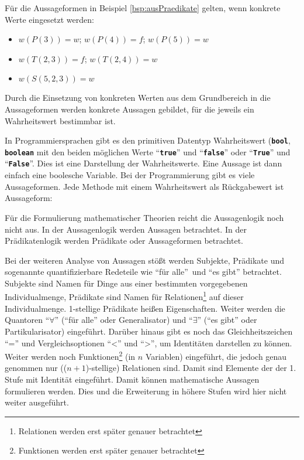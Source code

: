 \begin{Unit}[Beispiel]
Für die Aussageformen in Beispiel \ref{bsp:ausPraedikate} gelten, wenn 
konkrete Werte eingesetzt werden:
\begin{itemize}
  \item $w(P(3)) = w$; $w(P(4)) = f$; $w(P(5)) = w$
  \item $w(T(2,3)) = f$; $w(T(2,4)) = w$
  \item $w(S(5,2,3)) = w$
\end{itemize}

Durch die Einsetzung von konkreten Werten aus dem Grundbereich in die 
Aussageformen werden konkrete Aussagen gebildet, für die jeweils ein 
Wahrheitswert bestimmbar ist.
\end{Unit}

\begin{Unit}[Beispiel]
In Programmiersprachen gibt es den primitiven Datentyp Wahrheitswert
(\textbf{\texttt{bool}}, \textbf{\texttt{boolean}} mit den beiden möglichen 
Werte \enquote{\textbf{\texttt{true}}} und \enquote{\textbf{\texttt{false}}} 
oder \enquote{\textbf{\texttt{True}}} und \enquote{\textbf{\texttt{False}}}. 
Dies ist eine Darstellung der Wahrheitswerte. Eine Aussage ist dann einfach 
eine boolesche Variable. Bei der Programmierung gibt es viele Aussageformen. 
Jede Methode mit einem Wahrheitswert als Rückgabewert ist Aussageform:
\end{Unit}

\begin{Unit}[Anmerkung]
Für die Formulierung mathematischer Theorien reicht die Aussagenlogik noch 
nicht aus. In der Aussagenlogik werden Aussagen betrachtet. In der 
Prädikatenlogik werden Prädikate oder Aussageformen betrachtet.

Bei der weiteren Analyse von Aussagen stößt werden Subjekte, Prädikate und
sogenannte quantifizierbare Redeteile wie \enquote{für alle}\ und 
\enquote{es gibt} betrachtet. Subjekte sind Namen für Dinge aus einer 
bestimmten vorgegebenen Individualmenge, Prädikate sind Namen für 
Relationen\footnote{Relationen werden erst später genauer betrachtet} auf 
dieser Individualmenge. 1-stellige Prädikate heißen Eigenschaften. Weiter 
werden die Quantoren \enquote{$\forall$} (\enquote{für alle} oder 
Generalisator) und \enquote{$\exists$} (\enquote{es gibt} oder 
Partikularisator) eingeführt. Darüber hinaus gibt es noch das
Gleichheitszeichen \enquote{=} und Vergleichsoptionen \enquote{<} und 
\enquote{>}, um Identitäten darstellen zu können. Weiter werden noch 
Funktionen\footnote{Funktionen werden erst später genauer betrachtet} 
(in $n$ Variablen) eingeführt, die jedoch genau genommen nur 
(($n+1$)-stellige)  Relationen sind. Damit sind Elemente der
 der  1. Stufe mit Identität eingeführt. 
Damit können mathematische Aussagen formulieren werden. Dies und die 
Erweiterung in höhere Stufen wird hier nicht weiter ausgeführt. 
\end{Unit}

